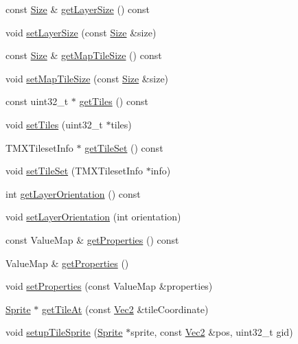 \begin{DoxyCompactItemize}
\item 
const \hyperlink{classSize}{Size} \& \hyperlink{classexperimental_1_1TMXLayer_a052a2a0dce9610b40cf6b7323bdcef5b}{get\+Layer\+Size} () const
\item 
void \hyperlink{classexperimental_1_1TMXLayer_a2448a36973d1f58f47136d5b6040f008}{set\+Layer\+Size} (const \hyperlink{classSize}{Size} \&size)
\item 
const \hyperlink{classSize}{Size} \& \hyperlink{classexperimental_1_1TMXLayer_a04180a8f4d7d96790212aabc959339de}{get\+Map\+Tile\+Size} () const
\item 
void \hyperlink{classexperimental_1_1TMXLayer_afc37ac1e61919a58fca4dfaf8b6e950b}{set\+Map\+Tile\+Size} (const \hyperlink{classSize}{Size} \&size)
\item 
const uint32\+\_\+t $\ast$ \hyperlink{classexperimental_1_1TMXLayer_aff7874cd19e0e387117b0f5c101c62f4}{get\+Tiles} () const
\item 
void \hyperlink{classexperimental_1_1TMXLayer_a8b38eb29a2a6cac31bdde2e78555dad0}{set\+Tiles} (uint32\+\_\+t $\ast$tiles)
\item 
T\+M\+X\+Tileset\+Info $\ast$ \hyperlink{classexperimental_1_1TMXLayer_a3a98b98dff7efe83ce30796eaf6f1a5f}{get\+Tile\+Set} () const
\item 
void \hyperlink{classexperimental_1_1TMXLayer_a864589e3f92c05635f7158922e884c98}{set\+Tile\+Set} (T\+M\+X\+Tileset\+Info $\ast$info)
\item 
int \hyperlink{classexperimental_1_1TMXLayer_a88cf778cbb137e03d2eec76d5f221825}{get\+Layer\+Orientation} () const
\item 
void \hyperlink{classexperimental_1_1TMXLayer_a0e2f58373e1e1124e7cb685ba57b6b20}{set\+Layer\+Orientation} (int orientation)
\item 
const Value\+Map \& \hyperlink{classexperimental_1_1TMXLayer_a1c2e4bb7d2ab4683b6c1d8c784b867bc}{get\+Properties} () const
\item 
Value\+Map \& \hyperlink{classexperimental_1_1TMXLayer_a356924361624560f9964aa9140a1f94a}{get\+Properties} ()
\item 
void \hyperlink{classexperimental_1_1TMXLayer_ad1a39654c70a971538a195ec861cb3f5}{set\+Properties} (const Value\+Map \&properties)
\item 
\hyperlink{classSprite}{Sprite} $\ast$ \hyperlink{classexperimental_1_1TMXLayer_a7fb4a490b6b26e07a34a2b379bb180b1}{get\+Tile\+At} (const \hyperlink{classVec2}{Vec2} \&tile\+Coordinate)
\item 
void \hyperlink{classexperimental_1_1TMXLayer_a7be28ea19c3ff186facd556602adbcb1}{setup\+Tile\+Sprite} (\hyperlink{classSprite}{Sprite} $\ast$sprite, const \hyperlink{classVec2}{Vec2} \&pos, uint32\+\_\+t gid)

\end{DoxyCompactItemize}
